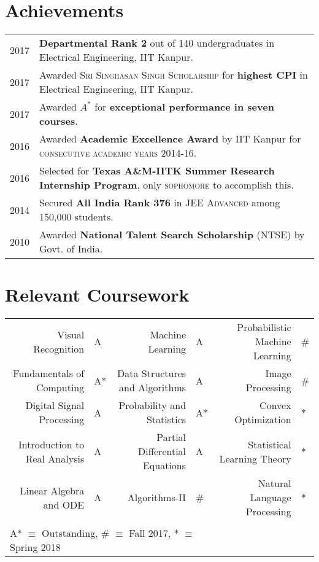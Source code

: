 \documentclass[a4paper,10pt]{article}
\begin{document}
\section{Achievements}
\begin{tabular}{rl}
2017 & \textbf{Departmental Rank 2} out of 140 undergraduates in Electrical
Engineering, IIT Kanpur.\\
2017 & Awarded \textsc{Sri Singhasan Singh Scholarship} for \textbf{highest CPI} in Electrical Engineering, IIT Kanpur.\\
2017 & Awarded $A^*$ for \textbf{exceptional performance in seven courses}.\\
2016 & Awarded \textbf{Academic Excellence Award} by IIT Kanpur for \textsc{consecutive academic years 2014-16}.\\
2016 & Selected for \textbf{Texas A\&M-IITK Summer Research Internship Program}, only \textsc{sophomore} to accomplish this.\\
2014 & Secured \textbf{All India Rank 376} in \textsc{JEE Advanced} among 150,000 students.\\
2010 & Awarded \textbf{National Talent Search Scholarship} (NTSE) by Govt. of India.

\end{tabular}
\section{Relevant Coursework}
\centering
\begin{tabular}{rl|rl|rl}
Visual Recognition & A & Machine Learning & A & Probabilistic Machine Learning & \#\\
Fundamentals of Computing & A* & Data Structures and Algorithms & A & Image Processing & \#\\
Digital Signal Processing & A & Probability and Statistics & A* & Convex Optimization & *\\
Introduction to Real Analysis & A & Partial Differential Equations & A & Statistical Learning Theory & *\\
Linear Algebra and ODE & A & Algorithms-II & \# & Natural Language Processing & *\\ \\

\multicolumn{4}{l}{\footnotesize A* $\equiv$ Outstanding, \# $\equiv$ Fall 2017, * $\equiv$ Spring 2018}\\
\end{tabular}
\end{document}
